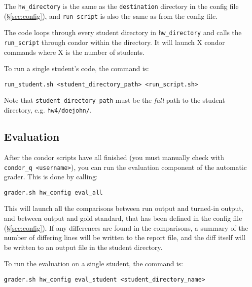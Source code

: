 \documentclass[12pt]{article}
\begin{document}
\vspace{5pt}

\noindent The \texttt{hw\_directory}  is the same as the \texttt{destination} directory in the config file (\S\ref{sec:config}), and \texttt{run\_script} is also the same as from the config file.

The code loops through every student directory in \texttt{hw\_directory} and calls the \texttt{run\_script} through condor within the directory. It will launch X condor commands where X is the number of students.

To run a single student's code, the command is:

\vspace{5pt}

\noindent \texttt{run\_student.sh <student\_directory\_path> <run\_script.sh>}

\vspace{5pt}

Note that \texttt{student\_directory\_path} must be the \textit{full} path to the student directory, e.g. \texttt{hw4/doejohn/}.

\subsection{Evaluation} \label{sec:secondgrade}

After the condor scripts have all finished (you must manually check with \texttt{condor\_q <username>}), you can run the evaluation component of the automatic grader. This is done by calling:

\vspace{5pt}

\noindent \texttt{grader.sh hw\_config eval\_all}

\vspace{5pt}

This will launch all the comparisons between run output and turned-in output, and between output and gold standard, that has been defined in the config file (\S\ref{sec:config}). If any differences are found in the comparisons, a summary of the number of differing lines will be written to the report file, and the diff itself will be written to an output file in the student directory.

To run the evaluation on a single student, the command is:

\vspace{5pt}

\noindent \texttt{grader.sh hw\_config eval\_student <student\_directory\_name>}
\end{document}
